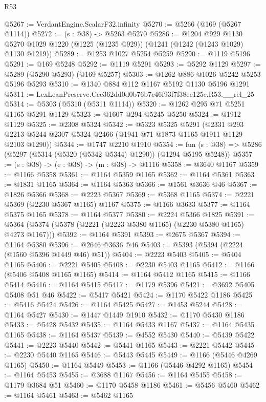 \begin{lexlean}{R53}
\begin{coremodule}
@5267 := VerdantEngine.ScalarF32.infinity
@5270 := @5266 (@169 (@5267 @1114))
@5272 := (s : @38) -> @5263 @5270
@5286 := @1204
    @929
    @1130
    @5270
    @1029
    @1220
    (@1225 (@1235 @929))
    (@1241 (@1242 (@1243 @1029) @1130 @1219))
@5289 := @1253 @1027 @5254 @5259
@5290 := @1119 @5196
@5291 := @169 @5248
@5292 := @1119 @5291
@5293 := @5292 @1129
@5297 := @5289 (@5290 @5293) (@169 @5257)
@5303 := @1262 @886 @1026 @5242 @5253 @5196 @5293
@5310 := @1340 @884 @112 @1167 @5192 @1130 @5196 @1291
@5311 := LexLeanPreserve.Ccc362dd0d0b76b7c46f93f7f38ec125e.R53.__rel_25
@5314 := @5303 (@5310 (@5311 @1114))
@5320 := @1262 @295 @71 @5251 @1165 @5291 @1129
@5323 := @1607 @294 @5245 @5250
@5324 := @1912 @1129
@5325 := @2308 @5324
@5342 := @5323
    @5325
    @5291
    (@2331 @293 @2213 @5244 @2307 @5324 @2466 (@1941 @71 @1873 @1165 @1911 @1129 @2103 @1290))
@5344 := @1747 @2210 @1910
@5354 := fun (s : @38) => @5286 (@5297 (@5314 (@5320 (@5342 @5344) @1290)) (@1294 @5195 @5248))
@5357 := (s : @38) -> (e : @38) -> (m : @38) -> @1116
@5358 := @3640 @1167
@5359 := @1166 @5358
@5361 := @1164 @5359 @1165
@5362 := @1164 @5361
@5363 := @1831 @1165
@5364 := @1164 @5363
@5366 := @1561 @3636 @46
@5367 := @1826 @5366
@5368 := @2223 @5367
@5369 := @5368 @1165
@5374 := @2221 @5369 (@2230 @5367 @1165) @1167
@5375 := @1166 @3633
@5377 := @1164 @5375 @1165
@5378 := @1164 @5377
@5380 := @2224 @5366 @1825
@5391 := @5364 (@5374 (@5378 (@2221 (@2223 @5380 @1165) (@2230 @5380 @1165) @4273 @1167)))
@5392 := @1164 @5391
@5393 := @2675 @5367
@5394 := @1164 @5380
@5396 := @2646 @3636 @46
@5403 := @5393 (@5394 (@2224 (@1560 @5396 @1449 @46) @51))
@5404 := @2223 @5403
@5405 := @5404 @1165
@5406 := @2221 @5405
@5408 := @2230 @5403 @1165
@5412 := @1166 (@5406 @5408 @1165 @1165)
@5414 := @1164 @5412 @1165
@5415 := @1166 @5414
@5416 := @1164 @5415
@5417 := @1179 @5396
@5421 := @3692 @5405 @5408 @51 @46
@5422 := @5417 @5421
@5424 := @1170 @5422 @1186
@5425 := @5416 @5424
@5426 := @1164 @5425
@5427 := @1453 @5244
@5428 := @1164 @5427
@5430 := @1447 @1449 @1910
@5432 := @1170 @5430 @1186
@5433 := @5428 @5432
@5435 := @1164 @5433 @1167
@5437 := @1164 @5435 @1165
@5438 := @1164 @5437
@5439 := @4552 @5430
@5440 := @5439 @5422
@5441 := @2223 @5440
@5442 := @5441 @1165
@5443 := @2221 @5442
@5445 := @2230 @5440 @1165
@5446 := @5443 @5445
@5449 := @1166 (@5446 @4269 @1165)
@5450 := @1164 @5449
@5453 := @1166 (@5446 @4292 @1165)
@5454 := @1164 @5453
@5455 := @3688 @1167
@5456 := @1164 @5455
@5458 := @1179 @3684 @51
@5460 := @1170 @5458 @1186
@5461 := @5456 @5460
@5462 := @1164 @5461
@5463 := @5462 @1165

\end{coremodule}
\end{lexlean}
